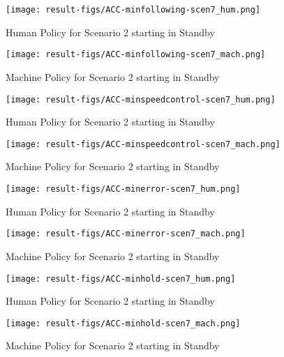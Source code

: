 \begin{figure}[h]
    \texttt{[image: result-figs/ACC-minfollowing-scen7\_hum.png]}
    \caption{Human Policy for Scenario 2 starting in Standby}
    \label{fig:following-s7-hum}
\end{figure}

\begin{figure}[h]
    \texttt{[image: result-figs/ACC-minfollowing-scen7\_mach.png]}
    \caption{Machine Policy for Scenario 2 starting in Standby}
    \label{fig:following-s7-mach}
\end{figure}

\begin{figure}[h]
    \texttt{[image: result-figs/ACC-minspeedcontrol-scen7\_hum.png]}
    \caption{Human Policy for Scenario 2 starting in Standby}
    \label{fig:speedcontrol-s7-hum}
\end{figure}

\begin{figure}[h]
    \texttt{[image: result-figs/ACC-minspeedcontrol-scen7\_mach.png]}
    \caption{Machine Policy for Scenario 2 starting in Standby}
    \label{fig:speedcontrol-s7-mach}
\end{figure}

\begin{figure}[h]
    \texttt{[image: result-figs/ACC-minerror-scen7\_hum.png]}
    \caption{Human Policy for Scenario 2 starting in Standby}
    \label{fig:error-s7-hum}
\end{figure}

\begin{figure}[h]
    \texttt{[image: result-figs/ACC-minerror-scen7\_mach.png]}
    \caption{Machine Policy for Scenario 2 starting in Standby}
    \label{fig:error-s7-mach}
\end{figure}

\begin{figure}[h]
    \texttt{[image: result-figs/ACC-minhold-scen7\_hum.png]}
    \caption{Human Policy for Scenario 2 starting in Standby}
    \label{fig:hold-s7-hum}
\end{figure}

\begin{figure}[h]
    \texttt{[image: result-figs/ACC-minhold-scen7\_mach.png]}
    \caption{Machine Policy for Scenario 2 starting in Standby}
    \label{fig:hold-s7-mach}
\end{figure}

